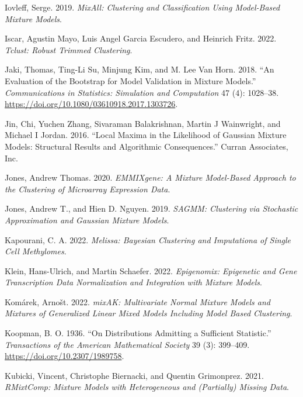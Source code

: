 \begin{CSLReferences}{1}{0}
\leavevmode{}%
Iovleff, Serge. 2019. \emph{MixAll: Clustering and Classification Using Model-Based Mixture Models}.

\leavevmode{}%
Iscar, Agustin Mayo, Luis Angel Garcia Escudero, and Heinrich Fritz. 2022. \emph{Tclust: Robust Trimmed Clustering}.

\leavevmode{}%
Jaki, Thomas, Ting-Li Su, Minjung Kim, and M. Lee Van Horn. 2018. {``An Evaluation of the Bootstrap for Model Validation in Mixture Models.''} \emph{Communications in Statistics: Simulation and Computation} 47 (4): 1028--38. \url{https://doi.org/10.1080/03610918.2017.1303726}.

\leavevmode{}%
Jin, Chi, Yuchen Zhang, Sivaraman Balakrishnan, Martin J Wainwright, and Michael I Jordan. 2016. {``Local {Maxima} in the {Likelihood} of {Gaussian Mixture Models}: {Structural Results} and {Algorithmic Consequences}.''} {Curran Associates, Inc.}

\leavevmode{}%
Jones, Andrew Thomas. 2020. \emph{EMMIXgene: A Mixture Model-Based Approach to the Clustering of Microarray Expression Data}.

\leavevmode{}%
Jones, Andrew T., and Hien D. Nguyen. 2019. \emph{SAGMM: Clustering via Stochastic Approximation and Gaussian Mixture Models}.

\leavevmode{}%
Kapourani, C. A. 2022. \emph{Melissa: Bayesian Clustering and Imputationa of Single Cell Methylomes}.

\leavevmode{}%
Klein, Hans-Ulrich, and Martin Schaefer. 2022. \emph{Epigenomix: Epigenetic and Gene Transcription Data Normalization and Integration with Mixture Models}.

\leavevmode{}%
Komárek, Arnošt. 2022. \emph{mixAK: Multivariate Normal Mixture Models and Mixtures of Generalized Linear Mixed Models Including Model Based Clustering}.

\leavevmode{}%
Koopman, B. O. 1936. {``On {Distributions Admitting} a {Sufficient Statistic}.''} \emph{Transactions of the American Mathematical Society} 39 (3): 399--409. \url{https://doi.org/10.2307/1989758}.

\leavevmode{}%
Kubicki, Vincent, Christophe Biernacki, and Quentin Grimonprez. 2021. \emph{RMixtComp: Mixture Models with Heterogeneous and (Partially) Missing Data}.


\end{CSLReferences}
